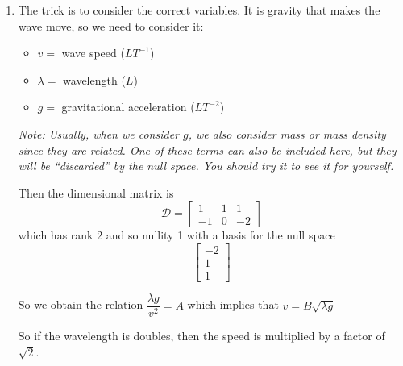 \begin{enumerate}
\newpage

\item The trick is to consider the correct variables. It is gravity that makes the wave move, so we need to consider it:
\begin{itemize}
	\item $v = $ wave speed ($L T^{-1}$)
	\item $\lambda = $ wavelength ($L$)
	\item $g = $ gravitational acceleration ($L T^{-2}$) 
\end{itemize}

\textit{Note: Usually, when we consider $g$, we also consider mass or mass density since they are related. One of these terms can also be included here, but they will be ``discarded'' by the null space. You should try it to see it for yourself.}

Then the dimensional matrix is
\[
\mathcal{D} = \begin{bmatrix}
 1	& 1		& 1 \\
 -1	& 0		& -2
 \end{bmatrix}
 \]
 which has rank 2 and so nullity 1 with a basis for the null space
 \[
 \begin{bmatrix}
 -2 \\ 1 \\ 1
 \end{bmatrix}
\]


So we obtain the relation $\dfrac{\lambda g}{v^2} = A$ which implies that $v = B \sqrt{\lambda g}$

So if the wavelength is doubles, then the speed is multiplied by a factor of $\sqrt{2}$.
\end{enumerate}
	
